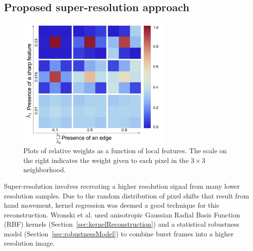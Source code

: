 \documentclass{sig-alternate}
\begin{document}


\subsection{Proposed super-resolution approach}

\begin{figure}
\centering
\includegraphics[width=18pc]{figures/Wronski2019-figure-8.pdf}
\caption{Plots of relative weights as a function of local features. The scale on the right indicates the weight given to each pixel in the $3\times 3$ neighborhood.~\cite{Wronski2019}}
\label{fig:Wronski2019Fig8}
\end{figure}

Super-resolution involves recreating a higher resolution signal from many lower resolution samples. Due to the random distribution of pixel shifts that result from hand movement, kernel regression was deemed a good technique for this reconstruction. Wronski et al. used anisotropic Gaussian Radial Basis Function (RBF) kernels (Section~\ref{sec:kernelReconstruction}) and a statistical robustness model (Section~\ref{sec:robustnessModel}) to combine burst frames into a higher resolution image.
\end{document}
